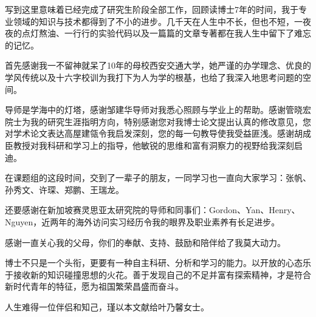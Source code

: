 


写到这里意味着已经完成了研究生阶段全部工作，回顾读博士7年的时间，我于专业领域的知识与技术都得到了不小的进步。几千天在人生中不长，但也不短，一夜夜的点灯熬油、一行行的实验代码以及一篇篇的文章专著都在我人生中留下了难忘的记忆。


首先感谢我一不留神就呆了10年的母校西安交通大学，她严谨的办学理念、优良的学风传统以及十六字校训为我打下为人为学的根基，也给了我深入地思考问题的空间。

导师是学海中的灯塔，感谢邹建华导师对我悉心照顾与学业上的帮助。感谢管晓宏院士为我的研究生涯指明方向，特别感谢您对我博士论文提出认真的修改意见，您对学术论文表达高屋建瓴令我启发深刻，您的每一句教导使我受益匪浅。感谢胡成臣教授对我科研和学习上的指导，他敏锐的思维和富有洞察力的视野给我深刻启迪。

在课题组的这段时间，交到了一辈子的朋友，一同学习也一直向大家学习：张帆、孙秀文、许琛、郑鹏、王瑞龙。

还要感谢在新加坡赛灵思亚太研究院的导师和同事们：Gordon、Yan、Henry、Nguyen，近两年的海外访问实习经历令我的眼界及职业素养有长足进步。

感谢一直关心我的父母，你们的奉献、支持、鼓励和陪伴给了我莫大动力。

博士不只是一个头衔，更要有一种自主科研、分析和学习的能力。以开放的心态乐于接收新的知识碰撞思想的火花。善于发现自己的不足并富有探索精神，才是符合新时代青年的特征，愿为祖国繁荣昌盛而奋斗。

人生难得一位伴侣和知己，瑾以本文献给叶乃馨女士。

